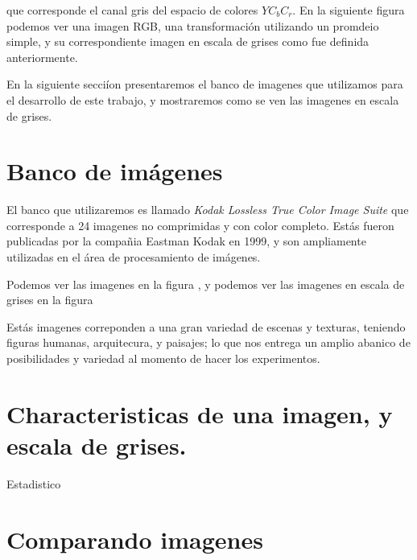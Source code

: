 que corresponde el canal gris del espacio de colores $YC_bC_r$. En la siguiente figura podemos ver una imagen RGB, una transformaci\'on utilizando un promdeio simple, y su correspondiente imagen en escala de grises como fue definida anteriormente.



En la siguiente secci\'ion presentaremos el banco de imagenes que utilizamos para el desarrollo de este trabajo, y mostraremos como se ven las imagenes en escala de grises.


\section{Banco de im\'agenes}

El banco que utilizaremos es llamado \textit{Kodak Lossless True Color Image Suite
}\cite{KodakLosslessTrueColorImageSuite} que corresponde a 24 imagenes no comprimidas y con color completo. Est\'as fueron publicadas por la compa\~nia Eastman Kodak en 1999, y son ampliamente utilizadas en el \'area de procesamiento de im\'agenes. 

Podemos ver las imagenes en la figura , y podemos ver las imagenes en escala de grises en la figura 


Est\'as imagenes correponden a una gran variedad de escenas y texturas, teniendo figuras humanas, arquitecura, y paisajes; lo que nos entrega un amplio abanico de posibilidades y variedad al momento de hacer los experimentos.

\section{Characteristicas de una imagen, y escala de grises.}


Estadistico

\section{Comparando imagenes}



